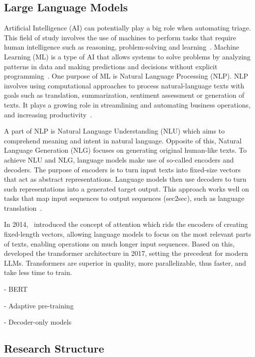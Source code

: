 \subsection{Large Language Models}
\label{subsec:intro-definitions}

Artificial Intelligence (AI) can potentially play a big role when automating triage.
This field of study involves the use of machines to perform tasks that require human intelligence such as reasoning,
problem-solving and learning\ \citep{oed:ai}.
Machine Learning (ML) is a type of AI that allows systems to solve problems by analyzing patterns in data and making
predictions and decisions without explicit programming\ \citep{oed:ml}.
One purpose of ML is Natural Language Processing (NLP).
NLP involves using computational approaches to process natural-language texts with goals such as translation,
summarization, sentiment assessment or generation of texts.
It plays a growing role in streamlining and automating business operations, and increasing
productivity\ \citep{ibm:siem}.

A part of NLP is Natural Language Understanding (NLU) which aims to comprehend meaning and intent in natural language.
Opposite of this, Natural Language Generation (NLG) focuses on generating original human-like texts.
To achieve NLU and NLG, language models make use of so-called encoders and decoders.
The purpose of encoders is to turn input texts into fixed-size vectors that act as abstract representations.
Language models then use decoders to turn such representations into a generated target output.
This approach works well on tasks that map input sequences to output sequences (sec2sec), such as language
translation\ \citep{sutskever2014sequence, cho2014learning}.

In 2014,\ \citet{bahdanau2014neural} introduced the concept of attention which rids the encoders of creating
fixed-length vectors, allowing language models to focus on the most relevant parts of texts, enabling operations on much
longer input sequences.
Based on this,\ \citet{vaswani2017attention} developed the transformer architecture in 2017, setting the precedent for
modern LLMs.
Transformers are superior in quality, more parallelizable, thus faster, and take less time to train.

- BERT

- Adaptive pre-training

- Decoder-only models

\subsection{Research Structure}
\label{subsec:intro-research-structure}

